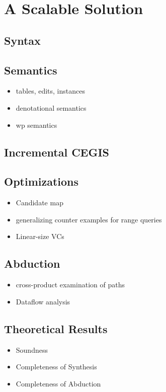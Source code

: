 \section{A Scalable Solution}
\subsection{Syntax}
\subsection{Semantics}
\begin{itemize}
\item tables, edits, instances
\item denotational semantics
\item wp semantics
\end{itemize}
\subsection{Incremental CEGIS}
\subsection{Optimizations}
\begin{itemize}
\item Candidate map
\item generalizing counter examples for range queries
\item Linear-size VCs
\end{itemize}

\subsection{Abduction}
\begin{itemize}
\item cross-product examination of paths
\item Dataflow analysis
\end{itemize}

\subsection{Theoretical Results}
\begin{itemize}
\item Soundness
\item Completeness of Synthesis
\item Completeness of Abduction
\end{itemize}

